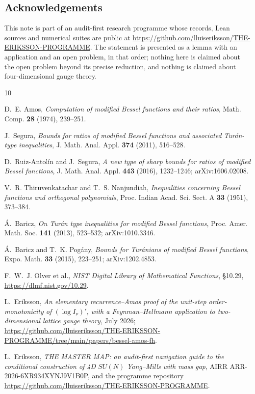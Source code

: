 \documentclass[11pt]{article}
\theoremstyle{remark}
\begin{document}
\subsection*{Acknowledgements}
This note is part of an audit-first research programme whose records,
Lean sources and numerical suites are public at
\url{https://github.com/lluiseriksson/THE-ERIKSSON-PROGRAMME}. The
statement is presented as a lemma with an application and an open
problem, in that order; nothing here is claimed about the open
problem beyond its precise reduction, and nothing is claimed about
four-dimensional gauge theory.

\begin{thebibliography}{10}\small

D.~E. Amos,
\emph{Computation of modified Bessel functions and their ratios},
Math. Comp. \textbf{28} (1974), 239--251.

J.~Segura,
\emph{Bounds for ratios of modified Bessel functions and associated
Tur\'an-type inequalities},
J. Math. Anal. Appl. \textbf{374} (2011), 516--528.

D.~Ruiz-Antol\'in and J.~Segura,
\emph{A new type of sharp bounds for ratios of modified Bessel
functions},
J. Math. Anal. Appl. \textbf{443} (2016), 1232--1246;
arXiv:1606.02008.

V.~R. Thiruvenkatachar and T.~S. Nanjundiah,
\emph{Inequalities concerning Bessel functions and orthogonal
polynomials},
Proc. Indian Acad. Sci. Sect. A \textbf{33} (1951), 373--384.

\'A.~Baricz,
\emph{On Tur\'an type inequalities for modified Bessel functions},
Proc. Amer. Math. Soc. \textbf{141} (2013), 523--532;
arXiv:1010.3346.

\'A.~Baricz and T.~K. Pog\'any,
\emph{Bounds for Tur\'anians of modified Bessel functions},
Expo. Math. \textbf{33} (2015), 223--251; arXiv:1202.4853.

F.~W.~J. Olver et al.,
\emph{NIST Digital Library of Mathematical Functions},
\S10.29, \url{https://dlmf.nist.gov/10.29}.

L.~Eriksson,
\emph{An elementary recurrence--Amos proof of the unit-step
order-monotonicity of $(\log I_\nu)'$, with a Feynman--Hellmann
application to two-dimensional lattice gauge theory},
July 2026;
\url{https://github.com/lluiseriksson/THE-ERIKSSON-PROGRAMME/tree/main/papers/bessel-amos-fh}.

L.~Eriksson,
\emph{THE MASTER MAP: an audit-first navigation guide to the
conditional construction of 4D $SU(N)$ Yang--Mills with mass gap},
AIRR ARR-2026-6XR934XYNJ9V1B0P, and the programme repository
\url{https://github.com/lluiseriksson/THE-ERIKSSON-PROGRAMME}.

\end{thebibliography}
\end{document}
